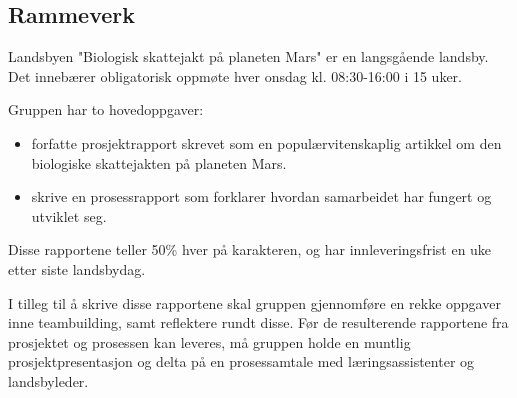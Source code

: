 \subsection{Rammeverk}

Landsbyen "Biologisk skattejakt på planeten Mars" er en langsgående landsby.
Det innebærer obligatorisk oppmøte hver onsdag kl. 08:30-16:00 i 15 uker.

Gruppen har to hovedoppgaver:
\begin{itemize}
\item forfatte prosjektrapport skrevet som en populærvitenskaplig artikkel om den biologiske skattejakten på planeten Mars.
\item skrive en prosessrapport som forklarer hvordan samarbeidet har fungert og utviklet seg.
\end{itemize}
Disse rapportene teller 50\% hver på karakteren, og har innleveringsfrist en uke etter siste landsbydag.

I tilleg til å skrive disse rapportene skal gruppen gjennomføre en rekke oppgaver inne teambuilding, samt reflektere rundt disse.
Før de resulterende rapportene fra prosjektet og prosessen kan leveres, må gruppen holde en muntlig prosjektpresentasjon og delta på en prosessamtale med læringsassistenter og landsbyleder. 
